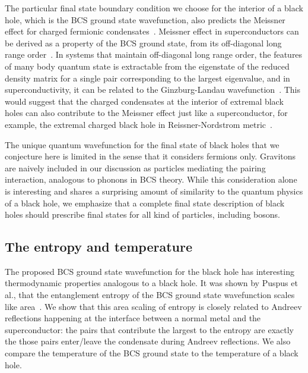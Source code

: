 \documentclass[10pt,letterpaper,aps,onecolumn,superscriptaddress,floatfix,notitlepage]{revtex4-1}
\begin{document}
	The particular final state boundary condition  we choose for the interior of a black hole, which is the BCS ground state wavefunction, also predicts the Meissner effect for charged fermionic condensates~\cite{BCS}. Meissner effect in superconductors can be derived as a property of the BCS ground state, from its off-diagonal long range order~\cite{rensink1967off,nieh1995off}. In systems that maintain off-diagonal long range order, the features of many body quantum state is extractable from the eigenstate of the reduced density matrix for a single pair corresponding to the largest eigenvalue, and in superconductivity, it can be related to the Ginzburg-Landau
	wavefunction~\cite{nieh1995off}. This would suggest that the charged condensates at the interior of extremal black holes can also contribute to the Meissner effect just like a superconductor, for example, the extremal charged black hole in Reissner-Nordstrom metric~\cite{bivcak1980stationary,penna2014black}. 
	
	The unique quantum wavefunction for the final state of black holes that we conjecture here is limited in the sense that it considers fermions only. Gravitons are naively included in our discussion as particles mediating the pairing interaction, analogous to phonons in BCS theory. While this consideration alone is interesting and shares a surprising amount of similarity to the quantum physics of a black hole, we emphasize that a complete final state description of black holes should prescribe final states for all kind of particles, including bosons.    
	\subsection{The entropy and temperature}   
	The proposed BCS ground state wavefunction for the black hole has interesting thermodynamic properties analogous to a black hole. It was shown by Puspus et al., that the entanglement entropy of the BCS ground state wavefunction scales like area~\cite{puspus2014entanglement}. We show that this area scaling of entropy is closely related to Andreev reflections happening at the interface between a normal metal and the superconductor: the pairs that contribute the largest to the entropy are exactly the those pairs enter/leave the condensate during Andreev reflections. We also compare the temperature of the BCS ground state to the temperature of a black hole.
	
\end{document}
